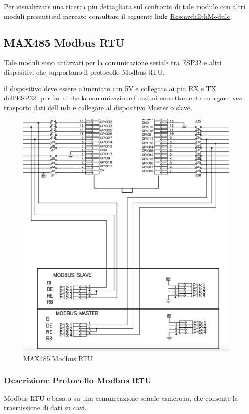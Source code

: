 \documentclass[12pt,a4paper]{report}
\begin{document}
Per visualizzare una ricerca piu dettagliata sul confronto di tale modulo con altri moduli presenti sul mercato consultare il seguente link: \href{https://github.com/AlessioTommasi-supsi/iotProject/tree/main/docs/ResearchEthModule}{ResearchEthModule}.

\subsection{MAX485 Modbus RTU} 

Tale moduli sono utilizzati per la comunicazione seriale tra ESP32 e altri dispositivi che supportano il protocollo Modbus RTU.

il dispositivo deve essere alimentato con 5V e collegato ai pin RX e TX dell'ESP32.
per far si che la comunicazione funzioni correttamente collegare cavo trasporto dati dell usb e collegare al dispositivo Master o slave.


\begin{figure}[H]
    \centering
    \includegraphics[width=0.9\linewidth]{../image/ModbusWiring.png}
    \caption{MAX485 Modbus RTU}
\end{figure}

\subsubsection{Descrizione Protocollo Modbus RTU}
Modbus RTU è basato su una comunicazione seriale asincrona, che consente la trasmissione di dati su cavi.
\end{document}
